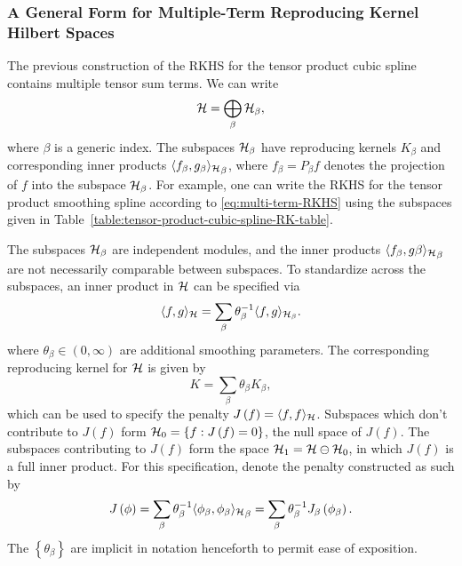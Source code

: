 \subsubsection{A General Form for Multiple-Term Reproducing Kernel Hilbert Spaces}

The previous construction of the RKHS for the tensor product cubic spline contains multiple tensor sum terms. We can write 
\begin{equation} \label{eq:multi-term-RKHS}
\mathcal{H} = \bigoplus\limits_{\beta} \mathcal{H}_\beta, 
\end{equation}
\noindent
where $\beta$ is a generic index. The subspaces $\mathcal{H}_\beta$ have reproducing kernels $K_\beta$ and corresponding inner products $\langle f_\beta,g_\beta {\rangle_{\mathcal{H}}}_\beta$, where $f_\beta = P_\beta f$ denotes the projection of $f$ into the subspace $\mathcal{H}_\beta$.  For example, one can write the RKHS for the tensor product smoothing spline according to \eqref{eq:multi-term-RKHS} using the subspaces given in Table~\ref{table:tensor-product-cubic-spline-RK-table}. 

\bigskip

The subspaces $\mathcal{H}_\beta$ are independent modules, and the inner products $\langle f_\beta,g\beta {\rangle_{\mathcal{H}}}_\beta$ are not necessarily comparable between subspaces. To standardize across the subspaces, an inner product in $\mathcal{H}$ can be specified via
\begin{equation} \label{eq:multi-term-inner-product}
\langle f,g \rangle_{\mathcal{H}} = \sum_\beta \theta_\beta^{-1} \langle f,g {\rangle_{\mathcal{H}_\beta}}.
\end{equation}
\noindent
where $\theta_\beta \in \left(0,\infty\right)$ are additional smoothing parameters. The corresponding reproducing kernel for $\mathcal{H}$ is given by 
\begin{equation} \label{eq:multi-term-RK}
K = \sum_\beta \theta_\beta K_\beta,
\end{equation}
\noindent
which can be used to specify the penalty $J\left(f\right) = \langle f,f \rangle_{\mathcal{H}}$. Subspaces which don't contribute to $J\left(f\right)$ form $\mathcal{H}_0 = \left\{f: J\left(f\right) = 0\right\}$, the null space of $J\left(f\right)$. The subspaces contributing to $J\left(f\right)$ form the space $\mathcal{H}_1 = \mathcal{H} \ominus \mathcal{H}_0$, in which $J\left(f\right)$ is a full inner product. For this specification, denote the penalty constructed as such by 
\begin{equation}\label{eq:multi-term-penalty}
J\left(\phi\right) =  \sum_{\beta} \theta^{-1}_\beta  \langle \phi_\beta,\phi_\beta {\rangle_{\mathcal{H}}}_\beta = \sum_{\beta} \theta^{-1}_\beta J_\beta \left( \phi_\beta \right).
\end{equation}
\noindent
The $\left \{ \theta_\beta \right\}$ are implicit in notation henceforth to permit ease of exposition.





